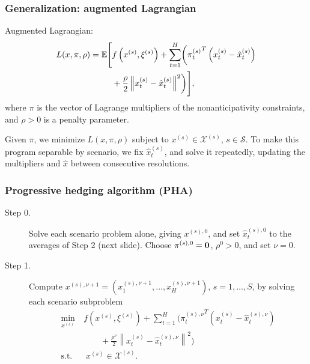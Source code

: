 \documentclass[aspectratio=169]{beamer}
\def\cS{\mathcal{S}}
\def\cX{\mathcal{X}}
\begin{document}
\begin{frame}
\frametitle{Generalization: augmented Lagrangian}

Augmented Lagrangian:
\begin{align*}
L(x,\pi,\rho) =  {\mathbb{E}} \Biggl[ & f\left( x^{(s)}, \xi^{(s)} \right) + \sum_{t = 1}^H \biggl( {\pi_t^{(s)}}^T \left(x_t^{(s)} - \hat{x}_t^{(s)}\right) \\
& + \frac{\rho}{2} \left\| x_t^{(s)} - \hat{x}_t^{(s)} \right\|^2 \biggr) \Biggr],
\end{align*}
where $\pi$ is the vector of Lagrange multipliers of the nonanticipativity constraints, and $\rho > 0$ is a penalty parameter.

\mbox{}

Given $\pi$, we minimize $L(x,\pi,\rho)$ subject to $x^{(s)} \in \cX^{(s)}$, $s \in \cS$.
To make this program separable by scenario, we fix $\hat{x}_t^{(s)}$, and solve it repeatedly, updating the multipliers and $\hat{x}$ between consecutive resolutions.

\end{frame}


\begin{frame}
\frametitle{Progressive hedging algorithm (PHA)}
\small

\begin{description}
	\item[Step 0.]
	Solve each scenario problem alone, giving $x^{(s),0}$, and set $\hat{x}_t^{(s),0}$ to the averages of Step 2 (next slide). Choose $\pi^{(s),0} = {\boldsymbol{0}}$, $\rho^0 > 0$, and set $\nu = 0$.
	\item[Step 1.]
	Compute $x^{(s),\nu+1} =  \left(x_1^{(s),\nu+1}, \dots, x_H^{(s),\nu+1}\right)$, $s = 1,\ldots,S$, by solving each scenario subproblem
	$$
	\begin{aligned}
	\min_{x^{(s)}} \ &  f\left( x^{(s)}, \xi^{(s)} \right) + \sum_{t = 1}^H \biggl( {\pi_t^{(s),\nu}}^T \left(x_t^{(s)} - \hat{x}_t^{(s),\nu}\right) \\
	& \qquad + \frac{\rho^\nu}{2} \left\| x_t^{(s)} - \hat{x}_t^{(s),\nu} \right\|^2 \biggr)\\
	\text{s.t.} & \; x^{(s)}  \in \mathcal{X}^{(s)}.
	\end{aligned}
	$$
\end{description}

\end{frame}
\end{document}

